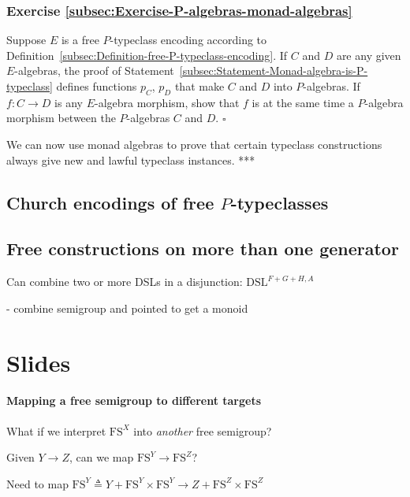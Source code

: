 \subsubsection{Exercise \label{subsec:Exercise-P-algebras-monad-algebras}\ref{subsec:Exercise-P-algebras-monad-algebras}}

Suppose $E$ is a free $P$-typeclass encoding according to Definition~\ref{subsec:Definition-free-P-typeclass-encoding}.
If $C$ and $D$ are any given $E$-algebras, the proof of Statement~\ref{subsec:Statement-Monad-algebra-is-P-typeclass}
defines functions $p_{C}$, $p_{D}$ that make $C$ and $D$ into
$P$-algebras. If $f:C\rightarrow D$ is any $E$-algebra morphism,
show that $f$ is at the same time a $P$-algebra morphism between
the $P$-algebras $C$ and $D$. $\square$

We can now use monad algebras to prove that certain typeclass constructions
always give new and lawful typeclass instances. {*}{*}{*}

\subsection{Church encodings of free $P$-typeclasses\label{subsec:Church-encodings-for-free-P-typeclasses}}

\subsection{Free constructions on more than one generator}

Can combine two or more DSLs in a disjunction: $\text{DSL}^{F+G+H,A}$ 

- combine semigroup and pointed to get a monoid

\section{Slides }


\paragraph{Mapping a free semigroup to different targets}

What if we interpret $\text{FS}^{X}$ into \emph{another} free semigroup?

Given $Y\rightarrow Z$, can we map $\text{FS}^{Y}\rightarrow\text{FS}^{Z}$?

Need to map $\text{FS}^{Y}\triangleq Y+\text{FS}^{Y}\times\text{FS}^{Y}\rightarrow Z+\text{FS}^{Z}\times\text{FS}^{Z}$

